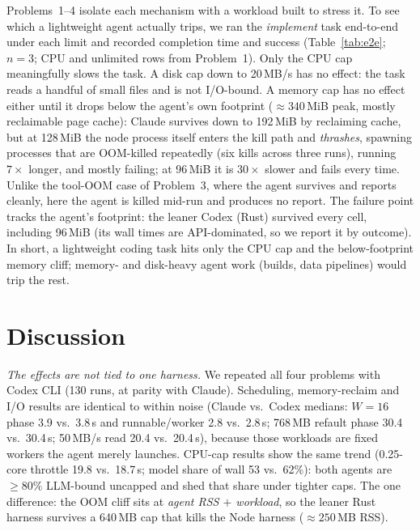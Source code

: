 \documentclass[10pt,conference]{IEEEtran}
\newcommand{\uu}[1]{\,\textsf{#1}}
\begin{document}
Problems~1--4 isolate each mechanism with a workload built to stress it. To
see which a lightweight agent actually trips, we ran the \emph{implement}
task end-to-end under each limit and recorded completion time and success
(Table~\ref{tab:e2e}; $n{=}3$; CPU and unlimited rows from Problem~1). Only the CPU cap meaningfully
slows the task. A disk cap down to 20\uu{MB/s} has no effect: the task
reads a handful of small files and is not I/O-bound. A memory cap has
no effect either until it drops below the agent's own footprint
(${\approx}340$\,MiB peak, mostly reclaimable page cache): Claude survives
down to 192\,MiB by reclaiming cache, but at 128\,MiB the node process
itself enters the kill path and \emph{thrashes}, spawning processes that are
OOM-killed repeatedly (six kills across three runs), running $7\times$
longer, and mostly failing; at 96\,MiB it is $30\times$ slower and fails
every time. Unlike the tool-OOM case of Problem~3, where the agent survives
and reports cleanly, here the agent is killed mid-run and produces no
report. The failure point tracks the agent's footprint: the leaner Codex
(Rust) survived every cell, including 96\,MiB (its wall times are
API-dominated, so we report it by outcome). In short, a
lightweight coding task hits only the CPU cap and the below-footprint
memory cliff; memory- and disk-heavy agent work (builds, data pipelines)
would trip the rest.

\section{Discussion}
\label{sec:consistency}

\emph{The effects are not tied to one harness.} We repeated all four
problems with Codex CLI (130 runs, at parity with Claude).
Scheduling, memory-reclaim and I/O results are identical to within noise
(Claude vs.\ Codex medians: $W{=}16$ phase 3.9 vs.\ 3.8\uu{s} and
runnable/worker 2.8 vs.\ 2.8\uu{s}; 768\,MB refault phase 30.4 vs.\
30.4\uu{s}; 50\uu{MB/s} read 20.4 vs.\ 20.4\uu{s}), because those workloads
are fixed workers the agent merely launches. CPU-cap results show
the same trend (0.25-core throttle 19.8 vs.\ 18.7\uu{s}; model share of
wall 53 vs.\ 62\%): both agents are ${\ge}80\%$ LLM-bound uncapped and
shed that share under tighter caps. The one difference: the OOM cliff sits
at \emph{agent RSS $+$ workload}, so the leaner Rust harness survives a
640\,MB cap that kills the Node harness (${\approx}250$\,MB RSS).
\end{document}
